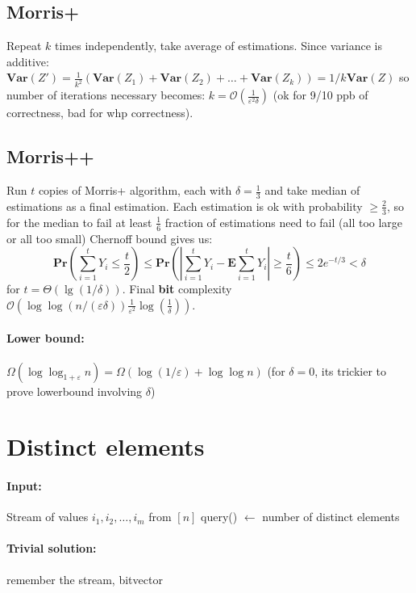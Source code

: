 \documentclass[11pt]{article}
\newcommand{\Ppb}{\mathbf{Pr}}
\newcommand{\Es}{\mathbf{E}}
\newcommand{\bigo}{\mathcal{O}}
\newcommand{\Var}{\mathbf{Var}}
\begin{document}
\subsection{Morris+}
Repeat $k$ times independently, take average of estimations.
Since variance is additive: $\Var(Z') = \frac{1}{k^2}  (\Var(Z_1) + \Var(Z_2) + \dots + \Var(Z_k)) = 1/k  \Var(Z)$ so number of iterations necessary becomes: $k = \bigo(\frac{1}{\varepsilon^2 \delta})$
(ok for 9/10 ppb of correctness, bad for whp correctness).

\subsection{Morris++}
Run $t$ copies of Morris+ algorithm, each with $\delta = \frac{1}{3}$ and take median of estimations as a final estimation. Each estimation is ok with probability $\geq \frac{2}{3}$, so for the median to fail at least $\frac{1}{6}$ fraction of estimations need to fail (all too large or all too small)
Chernoff bound gives us:
\begin{equation}
\Ppb \left(\sum_{i=1}^{t} Y_{i} \leq \frac{t}{2}\right) \leq \Ppb \left(\left|\sum_{i=1}^{t} Y_{i}-\Es \sum_{i=1}^{t} Y_{i}\right| \geq \frac{t}{6}\right) \leq 2 e^{-t / 3}<\delta
\end{equation}
for $t = \Theta(\lg (1 / \delta))$.
Final \textbf{bit} complexity $\bigo(\log \log (n/(\varepsilon \delta)) \frac{1}{\varepsilon^2} \log(\frac{1}{\delta}))$.

\paragraph{Lower bound:} $\Omega(\log \log_{1+\varepsilon} n) = \Omega(\log(1/\varepsilon) + \log \log n)$ (for $\delta=0$, its trickier to prove lowerbound involving $\delta$)


\section{Distinct elements}

\paragraph{Input:} Stream of values $i_1, i_2, …, i_m$ from $[n]$
query() $\leftarrow$ number of distinct elements

\paragraph{Trivial solution:} remember the stream, bitvector
\end{document}
